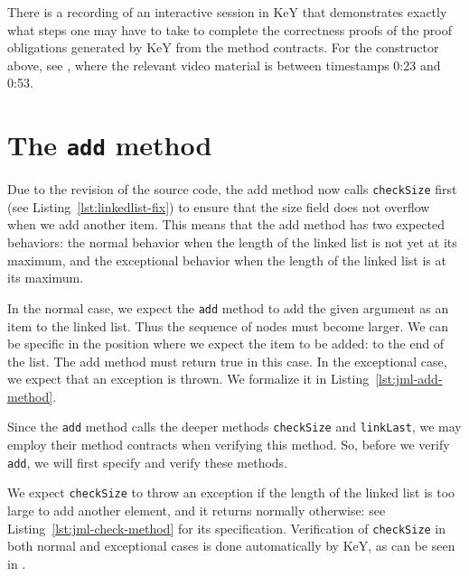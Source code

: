 \documentclass[runningheads]{llncs}
\begin{document}


There is a recording of an interactive session in KeY that demonstrates exactly what steps one may have to take to complete the correctness proofs of the proof obligations generated by KeY from the method contracts. For the constructor above, see \cite[0:23--0:53]{Bian2019addbranch}, where the relevant video material is between timestamps 0:23 and 0:53.

\section{The \texttt{add} method}\label{sec:add}

Due to the revision of the source code, the add method now calls \texttt{checkSize} first (see Listing~\ref{lst:linkedlist-fix}) to ensure that the size field does not overflow when we add another item. This means that the add method has two expected behaviors: the normal behavior when the length of the linked list is not yet at its maximum, and the exceptional behavior when the length of the linked list is at its maximum.

In the normal case, we expect the \texttt{add} method to add the given argument as an item to the linked list. Thus the sequence of nodes must become larger. We can be specific in the position where we expect the item to be added: to the end of the list. The add method must return true in this case. In the exceptional case, we expect that an exception is thrown. We formalize it in Listing~\ref{lst:jml-add-method}.



Since the \texttt{add} method calls the deeper methods \texttt{checkSize} and \texttt{linkLast}, we may employ their method contracts when verifying this method. So, before we verify \texttt{add}, we will first specify and verify these methods.

We expect \texttt{checkSize} to throw an exception if the length of the linked list is too large to add another element, and it returns normally otherwise: see Listing~\ref{lst:jml-check-method} for its specification. Verification of \texttt{checkSize} in both normal and exceptional cases is done automatically by KeY, as can be seen in \cite[0:54--1:24]{Bian2019addbranch}.
\end{document}
